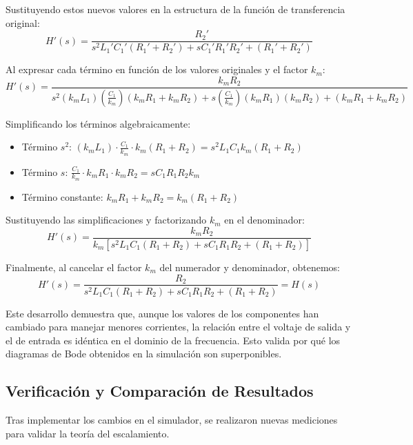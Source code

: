 Sustituyendo estos nuevos valores en la estructura de la función de transferencia original:
\begin{equation}
	H'(s) = \frac{R_2'}{s^2 L_1' C_1' (R_1' + R_2') + s C_1' R_1' R_2' + (R_1' + R_2')}
\end{equation}

Al expresar cada término en función de los valores originales y el factor $k_m$:
\begin{equation}
	H'(s) = \frac{k_m R_2}{s^2 (k_m L_1) \left(\frac{C_1}{k_m}\right) (k_m R_1 + k_m R_2) + s \left(\frac{C_1}{k_m}\right) (k_m R_1) (k_m R_2) + (k_m R_1 + k_m R_2)}
\end{equation}

Simplificando los términos algebraicamente:
\begin{itemize}
	\item Término $s^2$: $(k_m L_1) \cdot \frac{C_1}{k_m} \cdot k_m(R_1 + R_2) = s^2 L_1 C_1 k_m (R_1 + R_2)$
	\item Término $s$: $\frac{C_1}{k_m} \cdot k_m R_1 \cdot k_m R_2 = s C_1 R_1 R_2 k_m$
	\item Término constante: $k_m R_1 + k_m R_2 = k_m (R_1 + R_2)$
\end{itemize}

Sustituyendo las simplificaciones y factorizando $k_m$ en el denominador:
\begin{equation}
	H'(s) = \frac{k_m R_2}{k_m [s^2 L_1 C_1 (R_1 + R_2) + s C_1 R_1 R_2 + (R_1 + R_2)]}
\end{equation}

Finalmente, al cancelar el factor $k_m$ del numerador y denominador, obtenemos:
\begin{equation}
	H'(s) = \frac{R_2}{s^2 L_1 C_1 (R_1 + R_2) + s C_1 R_1 R_2 + (R_1 + R_2)} = H(s)
\end{equation}

Este desarrollo demuestra que, aunque los valores de los componentes han cambiado para manejar menores corrientes, la relación entre el voltaje de salida y el de entrada es idéntica en el dominio de la frecuencia. Esto valida por qué los diagramas de Bode obtenidos en la simulación son superponibles.

\subsection{Verificación y Comparación de Resultados}
Tras implementar los cambios en el simulador, se realizaron nuevas mediciones para validar la teoría del escalamiento.

